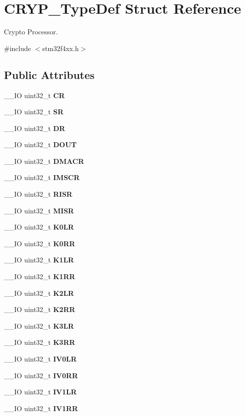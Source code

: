 \section{C\+R\+Y\+P\+\_\+\+Type\+Def Struct Reference}
\label{structCRYP__TypeDef}


Crypto Processor.  




{\ttfamily \#include $<$stm32f4xx.\+h$>$}

\subsection*{Public Attributes}
\begin{DoxyCompactItemize}
\item 
\+\_\+\+\_\+\+IO uint32\+\_\+t \textbf{ CR}
\item 
\+\_\+\+\_\+\+IO uint32\+\_\+t \textbf{ SR}
\item 
\+\_\+\+\_\+\+IO uint32\+\_\+t \textbf{ DR}
\item 
\+\_\+\+\_\+\+IO uint32\+\_\+t \textbf{ D\+O\+UT}
\item 
\+\_\+\+\_\+\+IO uint32\+\_\+t \textbf{ D\+M\+A\+CR}
\item 
\+\_\+\+\_\+\+IO uint32\+\_\+t \textbf{ I\+M\+S\+CR}
\item 
\+\_\+\+\_\+\+IO uint32\+\_\+t \textbf{ R\+I\+SR}
\item 
\+\_\+\+\_\+\+IO uint32\+\_\+t \textbf{ M\+I\+SR}
\item 
\+\_\+\+\_\+\+IO uint32\+\_\+t \textbf{ K0\+LR}
\item 
\+\_\+\+\_\+\+IO uint32\+\_\+t \textbf{ K0\+RR}
\item 
\+\_\+\+\_\+\+IO uint32\+\_\+t \textbf{ K1\+LR}
\item 
\+\_\+\+\_\+\+IO uint32\+\_\+t \textbf{ K1\+RR}
\item 
\+\_\+\+\_\+\+IO uint32\+\_\+t \textbf{ K2\+LR}
\item 
\+\_\+\+\_\+\+IO uint32\+\_\+t \textbf{ K2\+RR}
\item 
\+\_\+\+\_\+\+IO uint32\+\_\+t \textbf{ K3\+LR}
\item 
\+\_\+\+\_\+\+IO uint32\+\_\+t \textbf{ K3\+RR}
\item 
\+\_\+\+\_\+\+IO uint32\+\_\+t \textbf{ I\+V0\+LR}
\item 
\+\_\+\+\_\+\+IO uint32\+\_\+t \textbf{ I\+V0\+RR}
\item 
\+\_\+\+\_\+\+IO uint32\+\_\+t \textbf{ I\+V1\+LR}
\item 
\+\_\+\+\_\+\+IO uint32\+\_\+t \textbf{ I\+V1\+RR}
\end{DoxyCompactItemize}


